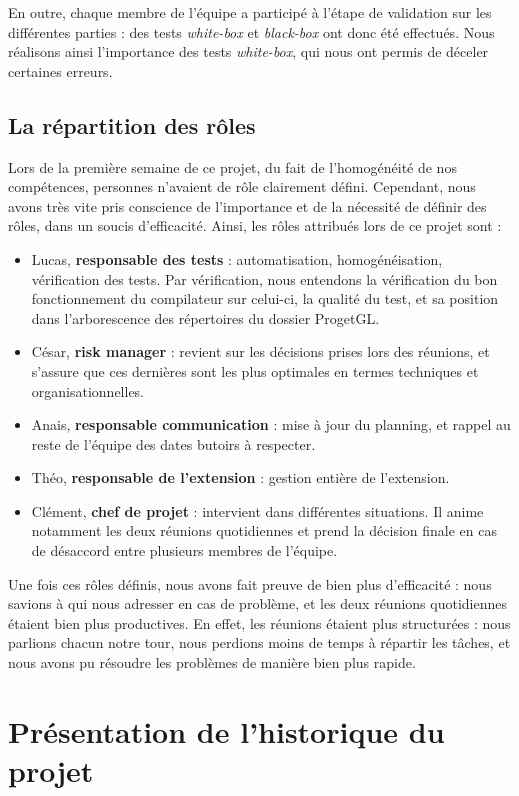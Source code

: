 \documentclass{article}
\begin{document}
En outre, chaque membre de l'équipe a participé à l'étape de validation sur les différentes parties : des tests \textit{white-box }et \textit{black-box} ont
donc été effectués. Nous réalisons ainsi l'importance des tests \textit{white-box}, qui nous ont permis de déceler certaines erreurs.

\subsection{La répartition des rôles}
Lors de la première semaine de ce projet, du fait de l'homogénéité de nos compétences,
personnes n'avaient de rôle clairement défini. Cependant, nous avons très vite pris conscience de l'importance et de la nécessité de
définir des rôles, dans un soucis d'efficacité.
Ainsi, les rôles attribués lors de ce projet sont :
\begin{itemize}
\item Lucas, \textbf{responsable des tests} : automatisation, homogénéisation, vérification des tests. Par vérification, nous entendons la vérification du
bon fonctionnement du compilateur sur celui-ci, la qualité du test, et sa position dans l'arborescence des répertoires du dossier ProgetGL.
\item César, \textbf{risk manager} : revient sur les décisions prises lors des réunions, et s'assure que ces dernières sont les plus optimales
en termes techniques et organisationnelles.
\item Anais, \textbf{responsable communication} :  mise à jour du planning, et rappel au reste de l’équipe des dates butoirs à respecter.
\item Théo, \textbf{responsable de l'extension} : gestion entière de l'extension.
\item Clément, \textbf{chef de projet} : intervient dans différentes situations. Il anime notamment les deux réunions quotidiennes et prend la décision finale en cas de désaccord entre plusieurs membres de l'équipe.
\end{itemize}
Une fois ces rôles définis, nous avons fait preuve de bien plus d'efficacité : nous savions à qui nous adresser en cas de problème, et
les deux réunions quotidiennes étaient bien plus productives. En effet, les réunions
étaient plus structurées : nous parlions chacun notre tour, nous perdions moins de temps à répartir les tâches, et nous avons pu résoudre
les problèmes de manière bien plus rapide.

\section{Présentation de l'historique du projet}
\end{document}
